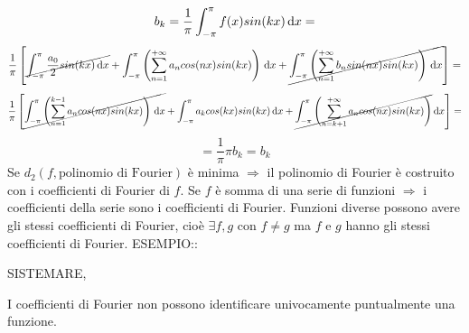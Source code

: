 \[b_k=\frac{1}{\pi}\int_{-\pi}^{\pi}f(x)sin(kx)\,\mathrm{d}{x}=\]
\[\frac{1}{\pi}\left[
\cancel{\int_{-\pi}^{\pi}\frac{a_0}{2}sin(kx)\,\mathrm{d}{x}}+
\int_{-\pi}^{\pi}\left(\sum\limits_{n=1}^{+\infty}a_ncos(nx)sin(kx)\right)\,\mathrm{d}{x}+
\cancel{\int_{-\pi}^{\pi}\left(\sum\limits_{n=1}^{+\infty}b_nsin(nx)sin(kx)\right)\,\mathrm{d}{x}}
\right]=\]
\[\frac{1}{\pi}\left[
\cancel{\int_{-\pi}^{\pi}\left(\sum\limits_{n=1}^{k-1} a_ncos(nx)sin(kx)\right)\,\mathrm{d}{x}}+
\int_{-\pi}^{\pi}a_kcos(kx)sin(kx)\,\mathrm{d}{x}+
\cancel{\int_{-\pi}^{\pi}\left(\sum\limits_{n=k+1}^{+\infty}a_ncos(nx)sin(kx)\right)}\,\mathrm{d}{x}
\right]=\]
\[=\frac{1}{\pi}\pi b_k=b_k\]
\observation
Se $d_2(f,\text{polinomio di Fourier})$ \`{e} minima $\Rightarrow$ il polinomio di Fourier \`{e} costruito con i coefficienti di Fourier di $f$.
\observation
Se $f$ \`{e} somma di una serie di funzioni $\Rightarrow$ i coefficienti della serie sono i coefficienti di Fourier.
\observation
Funzioni diverse possono avere gli stessi coefficienti di Fourier, cio\`{e} $\exists f,g$ con $f\ne g$ ma $f$ e $g$  hanno gli stessi coefficienti di Fourier.
ESEMPIO::
\begin{center}
	SISTEMARE,
\end{center}
\observation
I coefficienti di Fourier non possono identificare univocamente puntualmente una funzione.
